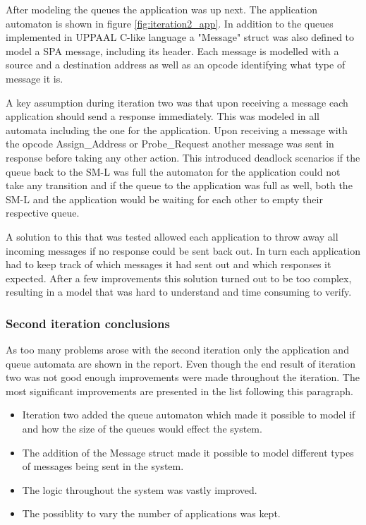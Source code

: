 After modeling the queues the application was up next. The application
automaton is shown in figure \ref{fig:iteration2_app}. In addition to the
queues implemented in UPPAAL C-like language a "Message" struct was also
defined to model a SPA message, including its header. Each message is modelled
with a source and a destination address as well as an opcode identifying what
type of message it is.

A key assumption during iteration two was that upon receiving a message each
application should send a response immediately. This was modeled in all
automata including the one for the application. Upon receiving a message with
the opcode Assign\_Address or Probe\_Request another message was sent in
response before taking any other action. This introduced deadlock scenarios if
the queue back to the SM-L was full the automaton for the application could not
take any transition and if the queue to the application was full as well, both
the SM-L and the application would be waiting for each other to empty their
respective queue.

A solution to this that was tested allowed each application to
throw away all incoming messages if no response could be sent back out. In turn
each application had to keep track of which messages it had sent out
and which responses it expected. After a few improvements this solution turned
out to be too complex, resulting in a model that was hard to understand and
time consuming to verify.

\subsubsection{Second iteration conclusions}
As too many problems arose with the second iteration only the application and
queue automata are shown in the report. Even though the end result of iteration
two was not good enough improvements were made throughout the iteration. The
most significant improvements are presented in the list following this
paragraph.

\begin{itemize}
    \item Iteration two added the queue automaton which made it possible to
        model if and how the size of the queues would effect the system.
    \item The addition of the Message struct made it possible to model
        different types of messages being sent in the system.
    \item The logic throughout the system was vastly improved.
    \item The possiblity to vary the number of applications was kept.
\end{itemize}

